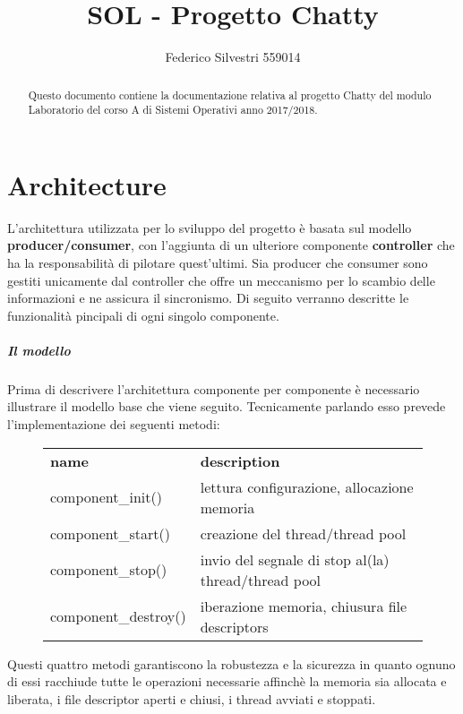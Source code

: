 \documentclass[]{article}
\title{SOL - Progetto Chatty}
\author{Federico Silvestri 559014}
\begin{document}
\maketitle


\begin{abstract}
Questo documento contiene la documentazione relativa al progetto Chatty del modulo Laboratorio del corso A di Sistemi Operativi anno 2017/2018.
\end{abstract}
\tableofcontents
\pagebreak

\section{Architecture}
L'architettura utilizzata per lo sviluppo del progetto \`e basata sul modello \textbf{producer/consumer},
con l'aggiunta di un ulteriore componente \textbf{controller} che ha la responsabilit\`a di pilotare quest'ultimi.
Sia producer che consumer sono gestiti unicamente dal controller che offre un meccanismo per lo scambio delle informazioni
e ne assicura il sincronismo. Di seguito verranno descritte le funzionalit\`a pincipali di ogni singolo componente.

\subparagraph[Una breve descrizione del modello]{Il modello}
Prima di descrivere l'architettura componente per componente \`e necessario illustrare il modello base che viene seguito.
Tecnicamente parlando esso prevede l'implementazione dei seguenti metodi:

\begin{figure}[H]
	\begin{table}[H]
		\begin{tabular}{ll}			
			\textbf{name} & \textbf{description} \\
			component\_init() & lettura configurazione, allocazione memoria \\
			component\_start() & creazione del thread/thread pool \\
			component\_stop() & invio del segnale di stop al(la) thread/thread pool \\
			component\_destroy() & iberazione memoria, chiusura file descriptors \\
		\end{tabular}
	\end{table}
\end{figure}

Questi quattro metodi garantiscono la robustezza e la sicurezza in quanto ognuno di essi racchiude
tutte le operazioni necessarie affinch\`e la memoria sia allocata e liberata, i file descriptor
aperti e chiusi, i thread avviati e stoppati.
\end{document}
